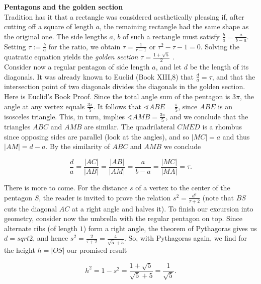 \documentclass[openany,12pt]{memoir}
\begin{document}
\begin{mdframed}[nobreak=true,backgroundcolor=gray!15]
\vspace{8pt}
{\Large\textbf{Pentagons and the golden section}}\\
[5pt]
Tradition has it that a rectangle was considered aesthetically pleasing 
if, after cutting off a square of length $a$, the remaining rectangle had 
the same shape as the original one. The side lengths $a$, $b$  of such a
rectangle must satisfy $\frac{b}{a}= \frac{a}{b-a}$. Setting $\tau := \frac{b}{a}$
for the ratio, we obtain $\tau = \frac{1}{r-1}$ or $\tau^2 - \tau - 1 = 0$. Solving
the quatratic equation yields the \textit{golden section} $\tau = \frac{1 + \sqrt{5}}{2}$ .\\

Consider now a regular pentagon of side length $a$, and let $d$ be the 
length of its diagonals. It was already known to Euclid (Book XIII,8) 
that $\frac{d}{a} = \tau$, and that the intersection point of two diagonals divides 
the diagonals in the golden section.\\

Here is Euclid's Book Proof. Since the total angle sum of the pentagon 
is $3\pi$, the angle at any vertex equals $\frac{3\pi}{5}$. It follows that 
$\sphericalangle ABE = \frac{\pi}{5}$, since $ABE$ is an isosceles triangle. This, in turn, 
implies $\sphericalangle AMB = \frac{3\pi}{5}$, and we conclude that the triangles $ABC$ and 
$AMB$ are similar. The quadrilateral $CMED$  is a rhombus since opposing sides are
parallel (look at the angles), and so $|MC| = a$ and thus $|AM| = d - a$. By the similarity of 
$ABC$ and $AMB$ we conclude

\begin{equation*}
  \frac{d}{a} = \frac{|AC|}{|AB|} = \frac{|AB|}{|AM|} = \frac{a}{b-a} = \frac{|MC|}{|MA|} = \tau.
\end{equation*}

There is more to come. For the distance $s$ of a vertex to the center of 
the pentagon $S$,  the reader is invited to prove the relation $s^2 = \frac{d^2}{\tau + 2}$ 
(note that $BS$ cuts the diagonal $AC$ at a right angle and halves it). 
To finish our excursion into geometry, consider now the umbrella 
with the regular pentagon on top. Since alternate ribs (of length $1$) 
form a right angle, the theorem of Pythagoras gives us $d = sqrt{2}$, and 
hence $s^2 = \frac{2}{\tau + 2} = \frac{4}{\sqrt{5} + 5}$. So, with Pythagoras again, 
we find for the height $h = |OS|$ our promised result

\begin{equation*}
  h^2 = 1 - s^2 = \frac{1+\sqrt{5}}{\sqrt{5}+5} = \frac{1}{\sqrt{5}}.
\end{equation*}

\vspace{5pt}

\end{mdframed}
\end{document}
